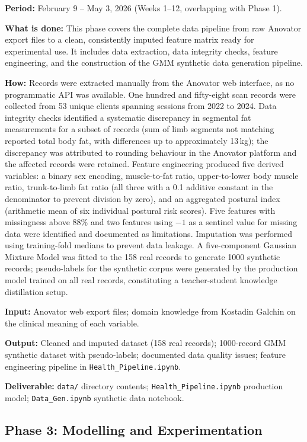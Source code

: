 \documentclass[11pt,a4paper]{article}
\begin{document}
\textbf{Period:} February 9 -- May 3, 2026 (Weeks 1--12, overlapping with Phase 1).

\textbf{What is done:} This phase covers the complete data pipeline from raw Anovator export files to a clean, consistently imputed feature matrix ready for experimental use. It includes data extraction, data integrity checks, feature engineering, and the construction of the GMM synthetic data generation pipeline.

\textbf{How:} Records were extracted manually from the Anovator web interface, as no programmatic API was available. One hundred and fifty-eight scan records were collected from 53 unique clients spanning sessions from 2022 to 2024. Data integrity checks identified a systematic discrepancy in segmental fat measurements for a subset of records (sum of limb segments not matching reported total body fat, with differences up to approximately 13\,kg); the discrepancy was attributed to rounding behaviour in the Anovator platform and the affected records were retained. Feature engineering produced five derived variables: a binary sex encoding, muscle-to-fat ratio, upper-to-lower body muscle ratio, trunk-to-limb fat ratio (all three with a 0.1 additive constant in the denominator to prevent division by zero), and an aggregated postural index (arithmetic mean of six individual postural risk scores). Five features with missingness above 88\% and two features using $-1$ as a sentinel value for missing data were identified and documented as limitations. Imputation was performed using training-fold medians to prevent data leakage. A five-component Gaussian Mixture Model was fitted to the 158 real records to generate 1000 synthetic records; pseudo-labels for the synthetic corpus were generated by the production model trained on all real records, constituting a teacher-student knowledge distillation setup.

\textbf{Input:} Anovator web export files; domain knowledge from Kostadin Galchin on the clinical meaning of each variable.

\textbf{Output:} Cleaned and imputed dataset (158 real records); 1000-record GMM synthetic dataset with pseudo-labels; documented data quality issues; feature engineering pipeline in \texttt{Health\_Pipeline.ipynb}.

\textbf{Deliverable:} \texttt{data/} directory contents; \texttt{Health\_Pipeline.ipynb} production model; \texttt{Data\_Gen.ipynb} synthetic data notebook.

\subsection{Phase 3: Modelling and Experimentation}
\end{document}
